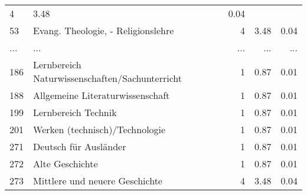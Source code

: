 \begin{longtable}{lXrrr}
          \num{4} &
          \num[round-mode=places,round-precision=2]{3,48} &
          \num[round-mode=places,round-precision=2]{0,04} \\
        53 & \multicolumn{1}{X}{Evang. Theologie, - Religionslehre} & %
          \num{4} &
          \num[round-mode=places,round-precision=2]{3,48} &
          \num[round-mode=places,round-precision=2]{0,04} \\
       ... & ... & ... & ... & ... \\
        186 & \multicolumn{1}{X}{Lernbereich Naturwissenschaften/Sachunterricht} & %
          \num{1} &
          \num[round-mode=places,round-precision=2]{0,87} &
          \num[round-mode=places,round-precision=2]{0,01} \\

        188 & \multicolumn{1}{X}{Allgemeine Literaturwissenschaft} & %
          \num{1} &
          \num[round-mode=places,round-precision=2]{0,87} &
          \num[round-mode=places,round-precision=2]{0,01} \\

        199 & \multicolumn{1}{X}{Lernbereich Technik} & %
          \num{1} &
          \num[round-mode=places,round-precision=2]{0,87} &
          \num[round-mode=places,round-precision=2]{0,01} \\

        201 & \multicolumn{1}{X}{Werken (technisch)/Technologie} & %
          \num{1} &
          \num[round-mode=places,round-precision=2]{0,87} &
          \num[round-mode=places,round-precision=2]{0,01} \\

        271 & \multicolumn{1}{X}{Deutsch für Ausländer} & %
          \num{1} &
          \num[round-mode=places,round-precision=2]{0,87} &
          \num[round-mode=places,round-precision=2]{0,01} \\

        272 & \multicolumn{1}{X}{Alte Geschichte} & %
          \num{1} &
          \num[round-mode=places,round-precision=2]{0,87} &
          \num[round-mode=places,round-precision=2]{0,01} \\

        273 & \multicolumn{1}{X}{Mittlere und neuere Geschichte} & %
          \num{4} &
          \num[round-mode=places,round-precision=2]{3,48} &
          \num[round-mode=places,round-precision=2]{0,04} \\


\end{longtable}
